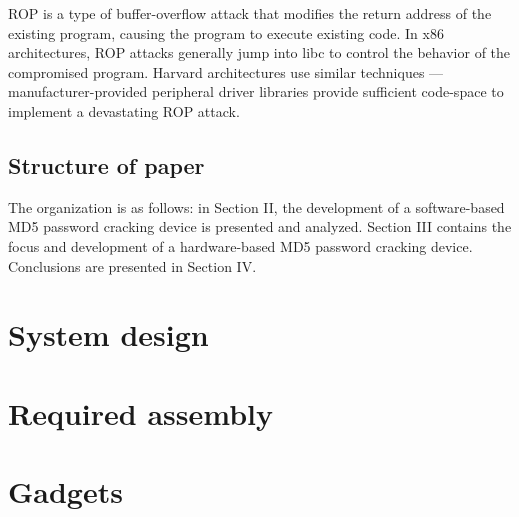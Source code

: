 	ROP is a type of buffer-overflow attack that modifies the return address of the existing program, causing the program to execute existing code. In x86 architectures, ROP attacks generally jump into libc to control the behavior of the compromised program. Harvard architectures use similar techniques --- manufacturer-provided peripheral driver libraries provide sufficient code-space to implement a devastating ROP attack.  



\subsection{Structure of paper}
	The organization is as follows: in Section II, the development of a software-based MD5 password cracking device is presented and analyzed. Section III contains the focus and development of a hardware-based MD5 password cracking device. Conclusions are presented in Section IV. 




\section{System design}


\section{Required assembly}


\section{Gadgets}


